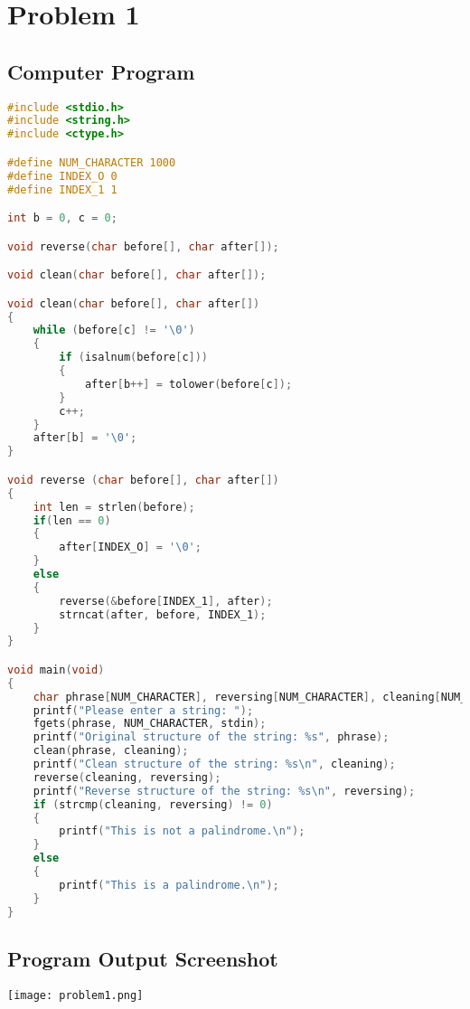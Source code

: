 {}

\section{{Problem 1}}

	\subsection{{Computer Program}}

		\begin{lstlisting}[language=C, caption=\textit{}]
#include <stdio.h>
#include <string.h>
#include <ctype.h>

#define NUM_CHARACTER 1000
#define INDEX_O 0
#define INDEX_1 1

int b = 0, c = 0;

void reverse(char before[], char after[]);

void clean(char before[], char after[]);

void clean(char before[], char after[])
{
    while (before[c] != '\0')
    {
        if (isalnum(before[c]))
        {
            after[b++] = tolower(before[c]);
        }
        c++;
    }
    after[b] = '\0';
}

void reverse (char before[], char after[])
{
    int len = strlen(before);
    if(len == 0)
    {
        after[INDEX_O] = '\0';
    }
    else
    {
        reverse(&before[INDEX_1], after);
        strncat(after, before, INDEX_1);
    }
}

void main(void)
{
    char phrase[NUM_CHARACTER], reversing[NUM_CHARACTER], cleaning[NUM_CHARACTER];
    printf("Please enter a string: ");
    fgets(phrase, NUM_CHARACTER, stdin);
    printf("Original structure of the string: %s", phrase);
    clean(phrase, cleaning);
    printf("Clean structure of the string: %s\n", cleaning);
    reverse(cleaning, reversing);
    printf("Reverse structure of the string: %s\n", reversing);
    if (strcmp(cleaning, reversing) != 0)
    {
        printf("This is not a palindrome.\n");
    }
    else
    {
        printf("This is a palindrome.\n");
    }
}


\end{lstlisting}

	\subsection{{Program Output Screenshot}}

		\texttt{[image: problem1.png]}
		

		
		
		